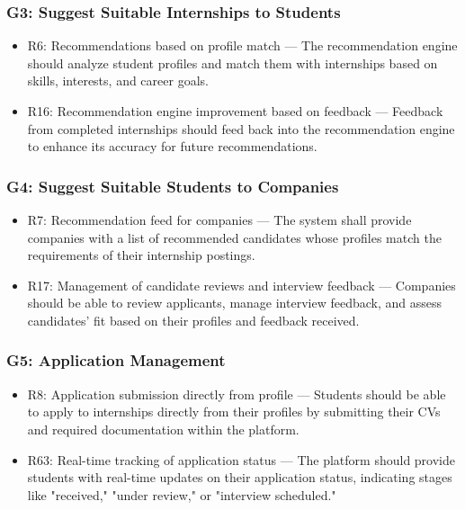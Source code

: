 \subsubsection{G3: Suggest Suitable Internships to Students}
    \begin{itemize}
        \item R6: Recommendations based on profile match — The recommendation engine should analyze student profiles and match them with internships based on skills, interests, and career goals.
        \item R16: Recommendation engine improvement based on feedback — Feedback from completed internships should feed back into the recommendation engine to enhance its accuracy for future recommendations.
    \end{itemize}

\subsubsection{G4: Suggest Suitable Students to Companies}
    \begin{itemize}
        \item R7: Recommendation feed for companies — The system shall provide companies with a list of recommended candidates whose profiles match the requirements of their internship postings.
        \item R17: Management of candidate reviews and interview feedback — Companies should be able to review applicants, manage interview feedback, and assess candidates’ fit based on their profiles and feedback received.
    \end{itemize}

\subsubsection{G5: Application Management}
    \begin{itemize}
        \item R8: Application submission directly from profile — Students should be able to apply to internships directly from their profiles by submitting their CVs and required documentation within the platform.
        \item R63: Real-time tracking of application status — The platform should provide students with real-time updates on their application status, indicating stages like "received," "under review," or "interview scheduled."
    \end{itemize}

